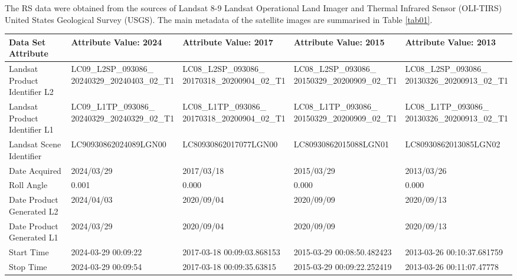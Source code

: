 \documentclass[jmse,article,submit,pdftex,moreauthors]{Definitions/mdpi}
\begin{document}
The RS data were obtained from the sources of Landsat 8-9 Landsat Operational Land Imager and Thermal Infrared Sensor (OLI-TIRS) United States Geological Survey (USGS). The main metadata of the satellite images are summarised in Table \ref{tab01}. 

\begin{table}
\centering
\small{
 \begin{tabular}{|l|l|l|l|l|}
    \hline
        \textbf{Data Set Attribute} & \textbf{Attribute Value: 2024} & \textbf{Attribute Value: 2017} & \textbf{Attribute Value: 2015} & \textbf{Attribute Value: 2013} \\ \hline
        \toprule
        Landsat Product Identifier L2 & \makecell{LC09\_L2SP\_093086\_ \\ 20240329\_20240403\_02\_T1} & \makecell{LC08\_L2SP\_093086\_ \\ 20170318\_20200904\_02\_T1} & \makecell{LC08\_L2SP\_093086\_ \\ 20150329\_20200909\_02\_T1} & \makecell{LC08\_L2SP\_093086\_ \\ 20130326\_20200913\_02\_T1} \\ \hline
        Landsat Product Identifier L1 & \makecell{LC09\_L1TP\_093086\_ \\ 20240329\_20240329\_02\_T1} & \makecell{LC08\_L1TP\_093086\_ \\ 20170318\_20200904\_02\_T1} & \makecell{LC08\_L1TP\_093086\_ \\ 20150329\_20200909\_02\_T1} & \makecell{LC08\_L1TP\_093086\_ \\ 20130326\_20200913\_02\_T1} \\ \hline
        Landsat Scene Identifier & LC90930862024089LGN00 & LC80930862017077LGN00 & LC80930862015088LGN01 & LC80930862013085LGN02 \\ \hline
        Date Acquired & 2024/03/29 & 2017/03/18 & 2015/03/29 & 2013/03/26 \\ \hline
        Roll Angle & 0.001 & 0.000 & 0.000 & 0.000 \\ \hline
        Date Product Generated L2 & 2024/04/03 & 2020/09/04 & 2020/09/09 & 2020/09/13 \\ \hline
        Date Product Generated L1 & 2024/03/29 & 2020/09/04 & 2020/09/09 & 2020/09/13 \\ \hline
        Start Time & 2024-03-29 00:09:22 & 2017-03-18 00:09:03.868153 & 2015-03-29 00:08:50.482423 & 2013-03-26 00:10:37.681759 \\ \hline
        Stop Time & 2024-03-29 00:09:54 & 2017-03-18 00:09:35.63815 & 2015-03-29 00:09:22.252419 & 2013-03-26 00:11:07.47778 \\ \hline

\end{tabular}}
\end{table}
\end{document}
